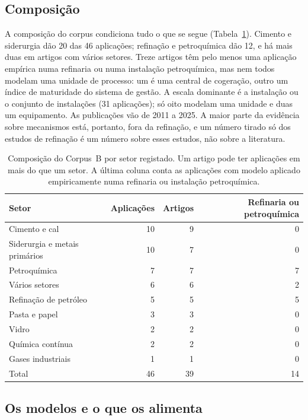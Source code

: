 \subsection{Composição}

A composição do corpus condiciona tudo o que se segue
(Tabela~\ref{tab:b-composicao}). Cimento e siderurgia dão 20 das 46
aplicações; refinação e petroquímica dão 12, e há mais duas em artigos com
vários setores. Treze artigos têm pelo menos uma aplicação empírica numa
refinaria ou numa instalação petroquímica, mas nem todos modelam uma
unidade de processo: um é uma central de cogeração, outro um índice de
maturidade do sistema de gestão. A escala dominante é a instalação ou o
conjunto de instalações (31 aplicações); só oito modelam uma unidade e
duas um equipamento. As publicações vão de 2011 a 2025. A maior parte da
evidência sobre mecanismos está, portanto, fora da refinação, e um número
tirado só dos estudos de refinação é um número sobre esses estudos, não
sobre a literatura.

\begin{table}[htbp]
  \centering
  \caption[Composição do Corpus B por setor]{Composição do Corpus~B por
  setor registado. Um artigo pode ter aplicações em mais do que um setor.
  A última coluna conta as aplicações com modelo aplicado empiricamente numa
  refinaria ou instalação petroquímica.}
  \label{tab:b-composicao}
  \begin{tabular}{lrrr}
    \toprule
    Setor & Aplicações & Artigos & Refinaria ou petroquímica \\
    \midrule
    Cimento e cal & 10 & 9 & 0 \\
    Siderurgia e metais primários & 10 & 7 & 0 \\
    Petroquímica & 7 & 7 & 7 \\
    Vários setores & 6 & 6 & 2 \\
    Refinação de petróleo & 5 & 5 & 5 \\
    Pasta e papel & 3 & 3 & 0 \\
    Vidro & 2 & 2 & 0 \\
    Química contínua & 2 & 2 & 0 \\
    Gases industriais & 1 & 1 & 0 \\
    \midrule
    Total & 46 & 39 & 14 \\
    \bottomrule
  \end{tabular}
\end{table}

\subsection{Os modelos e o que os alimenta}

